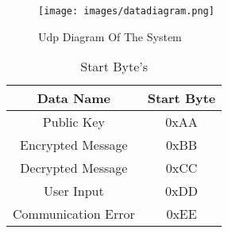 \documentclass[12pt]{article}
\begin{document}
 \newpage
 \begin{figure}[H]
 	\centering
 	\label{}
 	\texttt{[image: images/datadiagram.png]}\\[0.5 cm]	
 	\caption{Udp Diagram Of The System} 		
 \end{figure}

 \begin{table}[H]	
 	\centering
 	\begin{tabular}{|c|c|}
 		\hline
 		Data Name & Start Byte  \\
 		\hline
 		Public Key &  0xAA \\ \hline
 		Encrypted Message &  0xBB \\ \hline
 		Decrypted Message &  0xCC  \\ \hline
 		User Input & 0xDD  \\ \hline
 		Communication Error &  0xEE \\ \hline
 	\end{tabular}
	\caption{Start Byte's} 
\end{table}
 	\newpage
\end{document}
